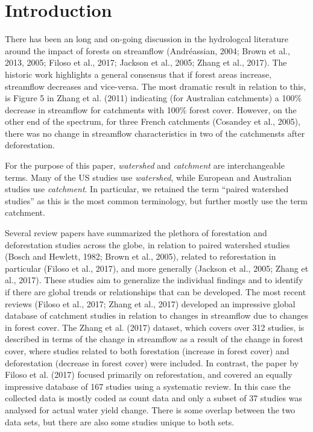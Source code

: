 \documentclass[]{elsarticle} %
\begin{document}
\hypertarget{introduction}{%
\section{Introduction}\label{introduction}}

There has been an long and on-going discussion in the hydrologcal literature around the impact of forests on streamflow (Andréassian, 2004; Brown et al., 2013, 2005; Filoso et al., 2017; Jackson et al., 2005; Zhang et al., 2017). The historic work highlights a general consensus that if forest areas increase, streamflow decreases and vice-versa. The most dramatic result in relation to this, is Figure 5 in Zhang et al. (2011) indicating (for Australian catchments) a 100\% decrease in streamflow for catchments with 100\% forest cover. However, on the other end of the spectrum, for three French catchments (Cosandey et al., 2005), there was no change in streamflow characteristics in two of the catchmensts after deforestation.

For the purpose of this paper, \emph{watershed} and \emph{catchment} are interchangeable terms. Many of the US studies use \emph{watershed}, while European and Australian studies use \emph{catchment}. In particular, we retained the term ``paired watershed studies'' as this is the most common terminology, but further mostly use the term catchment.

Several review papers have summarized the plethora of forestation and deforestation studies across the globe, in relation to paired watershed studies (Bosch and Hewlett, 1982; Brown et al., 2005), related to reforestation in particular (Filoso et al., 2017), and more generally (Jackson et al., 2005; Zhang et al., 2017). These studies aim to generalize the individual findings and to identify if there are global trends or relationships that can be developed. The most recent reviews (Filoso et al., 2017; Zhang et al., 2017) developed an impressive global database of catchment studies in relation to changes in streamflow due to changes in forest cover. The Zhang et al. (2017) dataset, which covers over 312 studies, is described in terms of the change in streamflow as a result of the change in forest cover, where studies related to both forestation (increase in forest cover) and deforestation (decrease in forest cover) were included. In contrast, the paper by Filoso et al. (2017) focused primarily on reforestation, and covered an equally impressive database of 167 studies using a systematic review. In this case the collected data is mostly coded as count data and only a subset of 37 studies was analysed for actual water yield change. There is some overlap between the two data sets, but there are also some studies unique to both sets.
\end{document}
